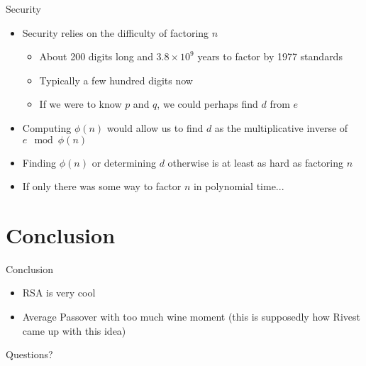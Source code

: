 \documentclass[handout, aspectratio=169]{beamer}
\begin{document}
\begin{frame}{Security}
    \begin{itemize}
        \item Security relies on the difficulty of factoring $n$
        \begin{itemize}
            \item About 200 digits long and $3.8 \times 10^9$ years to factor by 1977 standards
            \item Typically a few hundred digits now
             \item If we were to know $p$ and $q$, we could perhaps find $d$ from $e$
        \end{itemize}
        \item Computing $\phi(n)$ would allow us to find $d$ as the multiplicative inverse of $e \mod \phi(n)$
        \item Finding $\phi(n)$ or determining $d$ otherwise is at least as hard as factoring $n$
        \item If only there was some way to factor $n$ in polynomial time...
    \end{itemize}
\end{frame}

\section{Conclusion}
\frame{\sectionpage}

\begin{frame}{Conclusion}
    \begin{itemize}
        \item RSA is very cool
        \item Average Passover with too much wine moment (this is supposedly how Rivest came up with this idea)
    \end{itemize}
\end{frame}


\begin{frame}{}
      \begin{center}
    {\color{sigma@mainblue} \LARGE Questions?}
  \end{center}
\end{frame}
\end{document}
